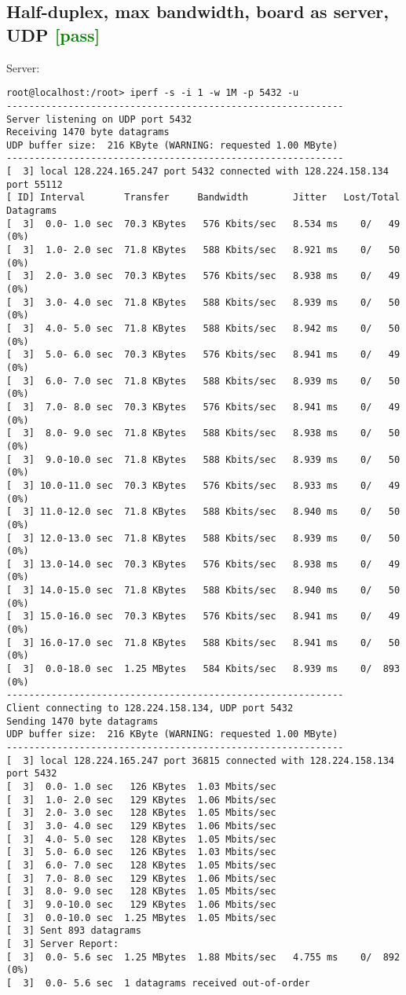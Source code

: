 \documentclass[a4paper]{report}
\begin{document}
\subsection{Half-duplex, max bandwidth, board as server, UDP \textcolor{green}{[pass]}}
Server:
\begin{lstlisting}
root@localhost:/root> iperf -s -i 1 -w 1M -p 5432 -u
------------------------------------------------------------
Server listening on UDP port 5432
Receiving 1470 byte datagrams
UDP buffer size:  216 KByte (WARNING: requested 1.00 MByte)
------------------------------------------------------------
[  3] local 128.224.165.247 port 5432 connected with 128.224.158.134 port 55112
[ ID] Interval       Transfer     Bandwidth        Jitter   Lost/Total Datagrams
[  3]  0.0- 1.0 sec  70.3 KBytes   576 Kbits/sec   8.534 ms    0/   49 (0%)
[  3]  1.0- 2.0 sec  71.8 KBytes   588 Kbits/sec   8.921 ms    0/   50 (0%)
[  3]  2.0- 3.0 sec  70.3 KBytes   576 Kbits/sec   8.938 ms    0/   49 (0%)
[  3]  3.0- 4.0 sec  71.8 KBytes   588 Kbits/sec   8.939 ms    0/   50 (0%)
[  3]  4.0- 5.0 sec  71.8 KBytes   588 Kbits/sec   8.942 ms    0/   50 (0%)
[  3]  5.0- 6.0 sec  70.3 KBytes   576 Kbits/sec   8.941 ms    0/   49 (0%)
[  3]  6.0- 7.0 sec  71.8 KBytes   588 Kbits/sec   8.939 ms    0/   50 (0%)
[  3]  7.0- 8.0 sec  70.3 KBytes   576 Kbits/sec   8.941 ms    0/   49 (0%)
[  3]  8.0- 9.0 sec  71.8 KBytes   588 Kbits/sec   8.938 ms    0/   50 (0%)
[  3]  9.0-10.0 sec  71.8 KBytes   588 Kbits/sec   8.939 ms    0/   50 (0%)
[  3] 10.0-11.0 sec  70.3 KBytes   576 Kbits/sec   8.933 ms    0/   49 (0%)
[  3] 11.0-12.0 sec  71.8 KBytes   588 Kbits/sec   8.940 ms    0/   50 (0%)
[  3] 12.0-13.0 sec  71.8 KBytes   588 Kbits/sec   8.939 ms    0/   50 (0%)
[  3] 13.0-14.0 sec  70.3 KBytes   576 Kbits/sec   8.938 ms    0/   49 (0%)
[  3] 14.0-15.0 sec  71.8 KBytes   588 Kbits/sec   8.940 ms    0/   50 (0%)
[  3] 15.0-16.0 sec  70.3 KBytes   576 Kbits/sec   8.941 ms    0/   49 (0%)
[  3] 16.0-17.0 sec  71.8 KBytes   588 Kbits/sec   8.941 ms    0/   50 (0%)
[  3]  0.0-18.0 sec  1.25 MBytes   584 Kbits/sec   8.939 ms    0/  893 (0%)
------------------------------------------------------------
Client connecting to 128.224.158.134, UDP port 5432
Sending 1470 byte datagrams
UDP buffer size:  216 KByte (WARNING: requested 1.00 MByte)
------------------------------------------------------------
[  3] local 128.224.165.247 port 36815 connected with 128.224.158.134 port 5432
[  3]  0.0- 1.0 sec   126 KBytes  1.03 Mbits/sec
[  3]  1.0- 2.0 sec   129 KBytes  1.06 Mbits/sec
[  3]  2.0- 3.0 sec   128 KBytes  1.05 Mbits/sec
[  3]  3.0- 4.0 sec   129 KBytes  1.06 Mbits/sec
[  3]  4.0- 5.0 sec   128 KBytes  1.05 Mbits/sec
[  3]  5.0- 6.0 sec   126 KBytes  1.03 Mbits/sec
[  3]  6.0- 7.0 sec   128 KBytes  1.05 Mbits/sec
[  3]  7.0- 8.0 sec   129 KBytes  1.06 Mbits/sec
[  3]  8.0- 9.0 sec   128 KBytes  1.05 Mbits/sec
[  3]  9.0-10.0 sec   129 KBytes  1.06 Mbits/sec
[  3]  0.0-10.0 sec  1.25 MBytes  1.05 Mbits/sec
[  3] Sent 893 datagrams
[  3] Server Report:
[  3]  0.0- 5.6 sec  1.25 MBytes  1.88 Mbits/sec   4.755 ms    0/  892 (0%)
[  3]  0.0- 5.6 sec  1 datagrams received out-of-order
\end{lstlisting}
\end{document}
